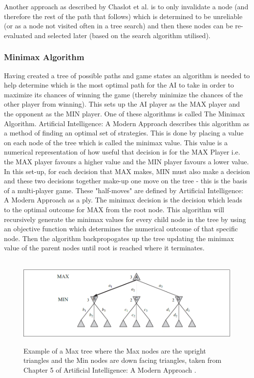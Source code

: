 \documentclass [11pt]{article}
\begin{document}
	\noindent Another approach as described by Chaslot et al. \cite{progressive} is to only invalidate a node (and therefore the rest of the path that follows) which is determined to be unreliable (or as a node not visited often in a tree search) and then these nodes can be re-evaluated and selected later (based on the search algorithm utilised).
	
	\subsubsection{Minimax Algorithm}
	Having created a tree of possible paths and game states an algorithm is needed to help determine which is the most optimal path for the AI to take in order to maximize its chances of winning the game (thereby minimize the chances of the other player from winning). This sets up the AI player as the MAX player and the opponent as the MIN player. One of these algorithms is called The Minimax Algorithm. Artificial Intelligence: A Modern Approach \cite{AIModern} describes this algorithm as a method of finding an optimal set of strategies. This is done by placing a value on each node of the tree which is called the minimax value. This value is a numerical representation of how useful that decision is for the MAX Player i.e. the MAX player favours a higher value and the MIN player favours a lower value. In this set-up, for each decision that MAX makes, MIN must also make a decision and these two decisions together make-up one move on the tree - this is the basis of a multi-player game. These "half-moves" are defined by Artificial Intelligence: A Modern Approach \cite{AIModern} as a ply. The minimax decision is the decision which leads to the optimal outcome for MAX from the root node. This algorithm will recursively generate the minimax values for every child node in the tree by using an objective function which determines the numerical outcome of that specific node. Then the algorithm backpropogates up the tree updating the minimax value of the parent nodes until root is reached where it terminates. \\
	\\
	\begin{figure}[H]
		\includegraphics[width=\textwidth]{minimax}\\
		\centering
		\caption{Example of a Max tree where the Max nodes are the upright triangles and the Min nodes are down facing triangles, taken from Chapter 5 of Artificial Intelligence: A Modern Approach \cite{AIModern}.}
		\label{ab}
	\end{figure}
	
\end{document}
